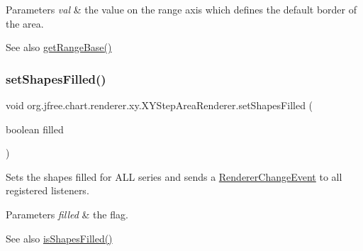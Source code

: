 \begin{DoxyParams}{Parameters}
{\em val} & the value on the range axis which defines the default border of the area.\\
\hline
\end{DoxyParams}
\begin{DoxySeeAlso}{See also}
\mbox{\hyperlink{classorg_1_1jfree_1_1chart_1_1renderer_1_1xy_1_1_x_y_step_area_renderer_af5930ee5f41050b92457a62b6f67be23}{get\+Range\+Base()}} 
\end{DoxySeeAlso}
\mbox{\label{classorg_1_1jfree_1_1chart_1_1renderer_1_1xy_1_1_x_y_step_area_renderer_a3a37119cd10d3facbcdb0d8bb00e9738}} 
\subsubsection{\texorpdfstring{set\+Shapes\+Filled()}{setShapesFilled()}}
{\footnotesize\ttfamily void org.\+jfree.\+chart.\+renderer.\+xy.\+X\+Y\+Step\+Area\+Renderer.\+set\+Shapes\+Filled (\begin{DoxyParamCaption}\item[{boolean}]{filled }\end{DoxyParamCaption})}

Sets the \textquotesingle{}shapes filled\textquotesingle{} for A\+LL series and sends a \mbox{\hyperlink{}{Renderer\+Change\+Event}} to all registered listeners.


\begin{DoxyParams}{Parameters}
{\em filled} & the flag.\\
\hline
\end{DoxyParams}
\begin{DoxySeeAlso}{See also}
\mbox{\hyperlink{classorg_1_1jfree_1_1chart_1_1renderer_1_1xy_1_1_x_y_step_area_renderer_aa4918ed44e42b921f005daf48d3fe2c8}{is\+Shapes\+Filled()}} 
\end{DoxySeeAlso}
\mbox{\label{classorg_1_1jfree_1_1chart_1_1renderer_1_1xy_1_1_x_y_step_area_renderer_a4b1baae27007b7c3ce8f0a102ddcafac}} 
